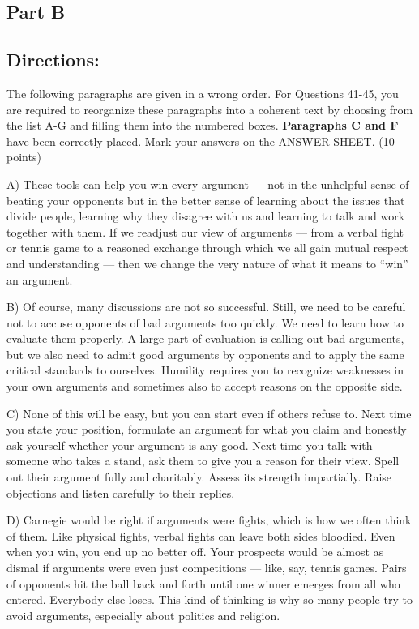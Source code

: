 \documentclass[UTF8,11pt]{ctexart}
\begin{document}
\subsection*{\textbf{Part B}}


\subsection*{\textbf{Directions:}}


The following paragraphs are given in a wrong order. For Questions 41-45, you are required to reorganize these paragraphs into a coherent text by choosing from the list A-G and filling them into the numbered boxes. \textbf{Paragraphs C and F} have been correctly placed. Mark your answers on the ANSWER SHEET. (10 points)


A) These tools can help you win every argument — not in the unhelpful sense of beating your opponents but in the better sense of learning about the issues that divide people, learning why they disagree with us and learning to talk and work together with them. If we readjust our view of arguments — from a verbal fight or tennis game to a reasoned exchange through which we all gain mutual respect and understanding — then we change the very nature of what it means to “win” an argument.


B) Of course, many discussions are not so successful. Still, we need to be careful not to accuse opponents of bad arguments too quickly. We need to learn how to evaluate them properly. A large part of evaluation is calling out bad arguments, but we also need to admit good arguments by opponents and to apply the same critical standards to ourselves. Humility requires you to recognize weaknesses in your own arguments and sometimes also to accept reasons on the opposite side.


C) None of this will be easy, but you can start even if others refuse to. Next time you state your position, formulate an argument for what you claim and honestly ask yourself whether your argument is any good. Next time you talk with someone who takes a stand, ask them to give you a reason for their view. Spell out their argument fully and charitably. Assess its strength impartially. Raise objections and listen carefully to their replies.


D) Carnegie would be right if arguments were fights, which is how we often think of them. Like physical fights, verbal fights can leave both sides bloodied. Even when you win, you end up no better off. Your prospects would be almost as dismal if arguments were even just competitions — like, say, tennis games. Pairs of opponents hit the ball back and forth until one winner emerges from all who entered. Everybody else loses. This kind of thinking is why so many people try to avoid arguments, especially about politics and religion.
\end{document}
